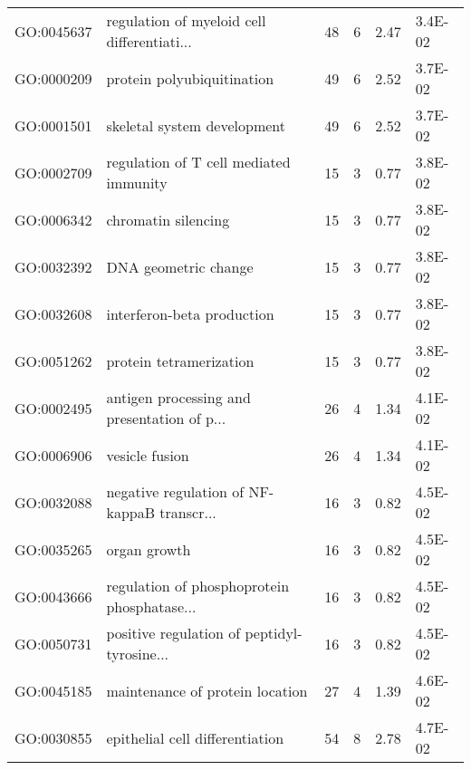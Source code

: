 \begin{table}
\begin{tabular}{llcccl}
  GO:0045637 & regulation of myeloid cell differentiati... &  48 &   6 & 2.47 & 3.4E-02 \\ 
  GO:0000209 & protein polyubiquitination &  49 &   6 & 2.52 & 3.7E-02 \\ 
  GO:0001501 & skeletal system development &  49 &   6 & 2.52 & 3.7E-02 \\ 
  GO:0002709 & regulation of T cell mediated immunity &  15 &   3 & 0.77 & 3.8E-02 \\ 
  GO:0006342 & chromatin silencing &  15 &   3 & 0.77 & 3.8E-02 \\ 
  GO:0032392 & DNA geometric change &  15 &   3 & 0.77 & 3.8E-02 \\ 
  GO:0032608 & interferon-beta production &  15 &   3 & 0.77 & 3.8E-02 \\ 
  GO:0051262 & protein tetramerization &  15 &   3 & 0.77 & 3.8E-02 \\ 
  GO:0002495 & antigen processing and presentation of p... &  26 &   4 & 1.34 & 4.1E-02 \\ 
  GO:0006906 & vesicle fusion &  26 &   4 & 1.34 & 4.1E-02 \\ 
  GO:0032088 & negative regulation of NF-kappaB transcr... &  16 &   3 & 0.82 & 4.5E-02 \\ 
  GO:0035265 & organ growth &  16 &   3 & 0.82 & 4.5E-02 \\ 
  GO:0043666 & regulation of phosphoprotein phosphatase... &  16 &   3 & 0.82 & 4.5E-02 \\ 
  GO:0050731 & positive regulation of peptidyl-tyrosine... &  16 &   3 & 0.82 & 4.5E-02 \\ 
  GO:0045185 & maintenance of protein location &  27 &   4 & 1.39 & 4.6E-02 \\ 
  GO:0030855 & epithelial cell differentiation &  54 &   8 & 2.78 & 4.7E-02 \\ 
   \hline
\end{tabular}
\label{Count-change, Negative}
\end{table}

